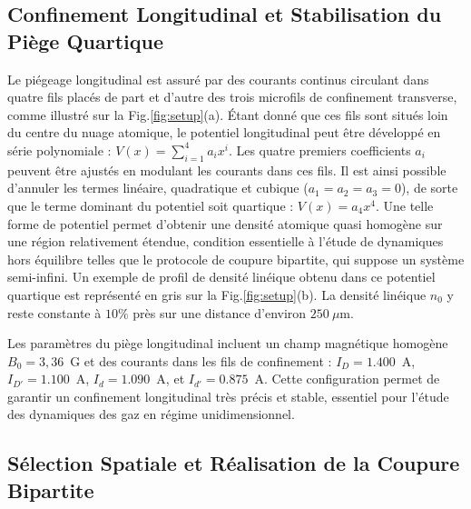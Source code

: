 \subsection{Confinement Longitudinal et Stabilisation du Piège Quartique}

Le piégeage longitudinal est assuré par des courants continus circulant dans quatre fils placés de part et d’autre des trois microfils de confinement transverse, comme illustré sur la Fig.\ref{fig:setup}(a). Étant donné que ces fils sont situés loin du centre du nuage atomique, le potentiel longitudinal peut être développé en série polynomiale : $V(x) = \sum_{i=1}^4 a_i x^i$. Les quatre premiers coefficients $a_i$ peuvent être ajustés en modulant les courants dans ces fils. Il est ainsi possible d’annuler les termes linéaire, quadratique et cubique ($a_1 = a_2 = a_3 = 0$), de sorte que le terme dominant du potentiel soit quartique : $V(x) = a_4 x^4$. Une telle forme de potentiel permet d’obtenir une densité atomique quasi homogène sur une région relativement étendue, condition essentielle à l’étude de dynamiques hors équilibre telles que le protocole de coupure bipartite, qui suppose un système semi-infini. Un exemple de profil de densité linéique obtenu dans ce potentiel quartique est représenté en gris sur la Fig.\ref{fig:setup}(b). La densité linéique $n_0$ y reste constante à $10\%$ près sur une distance d’environ $250~\mu$m.


Les paramètres du piège longitudinal incluent un champ magnétique homogène $B_0 = 3{,}36$~G et des courants dans les fils de confinement : $I_D = 1.400$~A, $I_{D'} = 1.100$~A, $I_d = 1.090$~A, et $I_{d'} = 0.875$~A. Cette configuration permet de garantir un confinement longitudinal très précis et stable, essentiel pour l'étude des dynamiques des gaz en régime unidimensionnel.

\subsection{Sélection Spatiale et Réalisation de la Coupure Bipartite}

